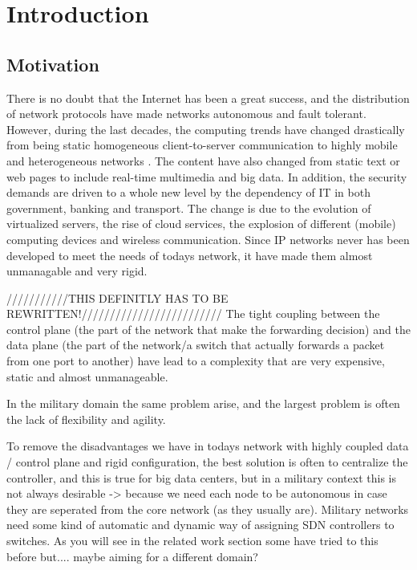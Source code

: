 \chapter{Introduction}
\section{Motivation}
There is no doubt that the Internet has been a great success, and the distribution of network protocols have made networks autonomous and fault tolerant\cite{SDN_Comprehencieve}. However, during the last decades, the computing trends have changed drastically \cite{ONF_SDN_Whitepaper} from being static homogeneous client-to-server communication to highly mobile and heterogeneous networks \cite{future_internet_ANA} \cite{ONF_SDN_Whitepaper}. The content have also changed from static text or web pages to include real-time multimedia and big data. In addition, the security demands are driven to a whole new level by the dependency of IT in both government, banking and transport. The change is due to the evolution of virtualized servers, the rise of cloud services, the explosion of different (mobile) computing devices and wireless communication. Since IP networks never has been developed to meet the needs of todays network, it have made them almost unmanagable and very rigid. 

///////////THIS DEFINITLY HAS TO BE REWRITTEN!/////////////////////////
The tight coupling between the control plane (the part of the network that make the forwarding decision) and the data plane (the part of the network/a switch that actually forwards a packet from one port to another) have lead to a complexity that are very expensive, static and almost unmanageable. 

In the military domain the same problem arise, and the largest problem is often the lack of flexibility and agility. 

To remove the disadvantages we have in todays network with highly coupled data / control plane and rigid configuration, the best solution is often to centralize the controller, and this is true for big data centers, but in a military context this is not always desirable  ->  because we need each node to be autonomous in case they are seperated from the core network (as they usually are). Military networks need some kind of automatic and dynamic way of assigning SDN controllers to switches. As you will see in the related work section some have tried to this before but.... maybe aiming for a different domain? 

